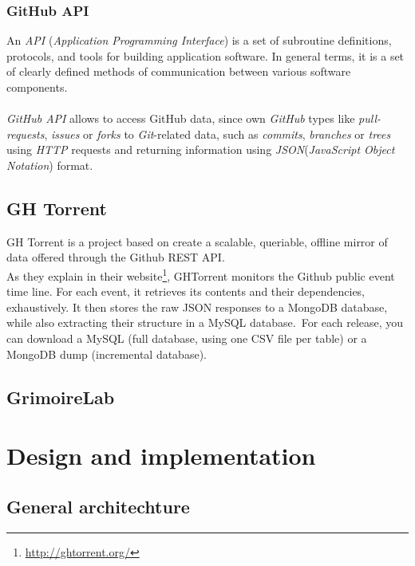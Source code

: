\documentclass[a4paper, 12pt]{book}
\begin{document}
\subsection{GitHub API}
\label{sec_gh-api}
An \emph{API} (\textit{Application Programming Interface}) is a set of subroutine definitions, protocols, and tools for building
application software. In general terms, it is a set of clearly defined methods of communication between various software components.\\\\
\emph{GitHub API} allows to access GitHub data, since own \emph{GitHub} types like \textit{pull-requests}, \textit{issues} or \textit{forks}
to \emph{Git}-related data, such as \textit{commits}, \textit{branches} or \textit{trees} using \textit{HTTP} requests and
returning information using \emph{JSON}(\textit{JavaScript Object Notation}) format.
\section{GH Torrent}
\label{sec:ghtorrent}
GH Torrent is a project based on create a scalable, queriable, offline mirror of data offered through the Github REST API.\\
As they explain in their website\footnote{\url{http://ghtorrent.org/}}, GHTorrent monitors the Github public event time line.
For each event, it retrieves its contents and their dependencies, exhaustively. It then stores the raw JSON responses to a MongoDB
database, while also extracting their structure in a MySQL database.\
For each release, you can download a MySQL (full database, using one CSV file per table) or a MongoDB dump (incremental database).\\

\section{GrimoireLab}
\label{sec:grimoire}
\cleardoublepage
\chapter{Design and implementation}
\section{General architechture}
\label{sec:arquitectura}
\end{document}
